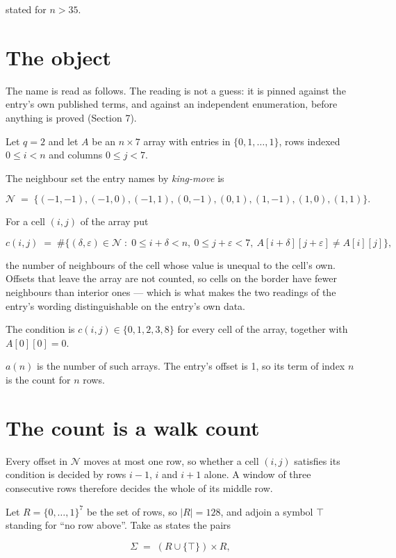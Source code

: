 \documentclass[11pt]{article}
\theoremstyle{definition}
\begin{document}
stated for $n > 35$.

\section{The object}

The name is read as follows. The reading is not a guess: it is pinned against the entry's own published terms, and against an independent enumeration, before anything is proved (Section 7).

Let $q = 2$ and let $A$ be an $n \times 7$ array with entries in $\{0,1,\dots,1\}$, rows indexed $0 \le i < n$ and columns $0 \le j < 7$.

The neighbour set the entry names by {\itshape king-move} is

\[\mathcal{N} \;=\; \{(-1,-1), (-1,0), (-1,1), (0,-1), (0,1), (1,-1), (1,0), (1,1)\}.\]

For a cell $(i,j)$ of the array put

\[c(i,j) \;=\; \#\bigl\{(\delta,\varepsilon)\in\mathcal{N} \;:\; 0\le i+\delta<n,\ 0\le j+\varepsilon<7,\ A[i+\delta][j+\varepsilon] \neq A[i][j]\bigr\},\]

the number of neighbours of the cell whose value is unequal to the cell's own. Offsets that leave the array are not counted, so cells on the border have fewer neighbours than interior ones --- which is what makes the two readings of the entry's wording distinguishable on the entry's own data.

The condition is $c(i,j) \in \{0, 1, 2, 3, 8\}$ for every cell of the array, together with $A[0][0]=0$.

$a(n)$ is the number of such arrays. The entry's offset is 1, so its term of index $n$ is the count for $n$ rows.

\section{The count is a walk count}

Every offset in $\mathcal{N}$ moves at most one row, so whether a cell $(i,j)$ satisfies its condition is decided by rows $i-1$, $i$ and $i+1$ alone. A window of three consecutive rows therefore decides the whole of its middle row.

Let $R = \{0,\dots,1\}^{7}$ be the set of rows, so $|R| = 128$, and adjoin a symbol $\top$ standing for ``no row above''. Take as states the pairs

\[\Sigma \;=\; (R \cup \{\top\}) \times R,\]
\end{document}
